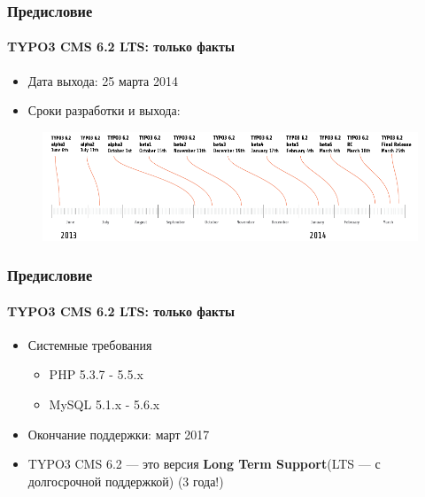 
\begin{frame}[fragile]

	\frametitle{Предисловие}
	\framesubtitle{TYPO3 CMS 6.2 LTS: только факты}

	\begin{itemize}
		\item Дата выхода: 25 марта 2014
		\item Сроки разработки и выхода:
	\end{itemize}

	\begin{figure}
		\includegraphics[width=0.99\linewidth]{Images/Introduction/ReleaseTimeline.png}
	\end{figure}

\end{frame}


\begin{frame}[fragile]
	\frametitle{Предисловие}
	\framesubtitle{TYPO3 CMS 6.2 LTS: только факты}

	\begin{itemize}
		\item Системные требования
		\begin{itemize}
			\item PHP	\tabto{2cm} 5.3.7 - 5.5.x
			\item MySQL	\tabto{2cm} 5.1.x - 5.6.x
		\end{itemize}
	\end{itemize}

	\begin{itemize}
		\item Окончание поддержки: март 2017
		\item TYPO3 CMS 6.2 — это версия \textbf{Long Term Support}\newline(LTS — с долгосрочной поддержкой) (3 года!)
	\end{itemize}

\end{frame}

